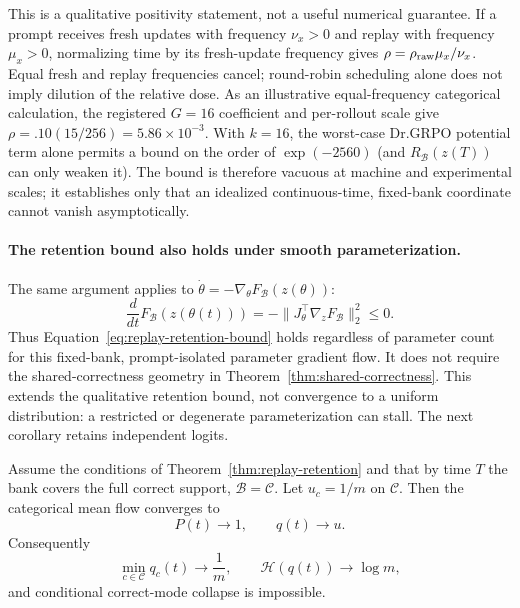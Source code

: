 This is a qualitative positivity statement, not a useful numerical guarantee.
If a prompt receives fresh updates with frequency $\nu_x>0$ and replay with
frequency $\mu_x>0$, normalizing time by its fresh-update frequency gives
$\rho=\rho_{\rm raw}\mu_x/\nu_x$. Equal fresh and replay frequencies cancel;
round-robin scheduling alone does not imply dilution of the relative dose.
As an illustrative equal-frequency categorical calculation, the registered
$G=16$ coefficient and per-rollout scale give
$\rho=.10(15/256)=5.86\times10^{-3}$. With $k=16$, the worst-case Dr.GRPO
potential term alone permits a bound on the order of $\exp(-2560)$ (and
$R_{\mathcal B}(z(T))$ can only weaken it). The bound is therefore vacuous at
machine and experimental scales; it establishes only that an idealized
continuous-time, fixed-bank coordinate cannot vanish asymptotically.

\paragraph{The retention bound also holds under smooth parameterization.}
The same argument applies to $\dot\theta=-\nabla_\theta F_{\mathcal B}(z(\theta))$:
\[
 \frac{d}{dt}F_{\mathcal B}(z(\theta(t)))
 =-\lVert J_\theta^\top\nabla_zF_{\mathcal B}\rVert_2^2\le0.
\]
Thus Equation~\eqref{eq:replay-retention-bound} holds regardless of parameter
count for this fixed-bank, prompt-isolated parameter gradient flow. It does
not require the shared-correctness geometry in
Theorem~\ref{thm:shared-correctness}. This extends the qualitative retention
bound, not convergence to a uniform distribution: a restricted or degenerate
parameterization can stall. The next corollary retains independent logits.

\begin{corollary}
\label{cor:replay-no-collapse}
Assume the conditions of Theorem~\ref{thm:replay-retention} and that by time
$T$ the bank covers the full correct support, $\mathcal B=\mathcal C$. Let
$u_c=1/m$ on $\mathcal C$. Then the categorical mean flow converges to
\[
  P(t)\longrightarrow1,
  \qquad q(t)\longrightarrow u.
\]
Consequently
\[
  \min_{c\in\mathcal C}q_c(t)\longrightarrow\frac1m,
  \qquad
  \mathcal H(q(t))\longrightarrow\log m,
\]
and conditional correct-mode collapse is impossible.
\end{corollary}

